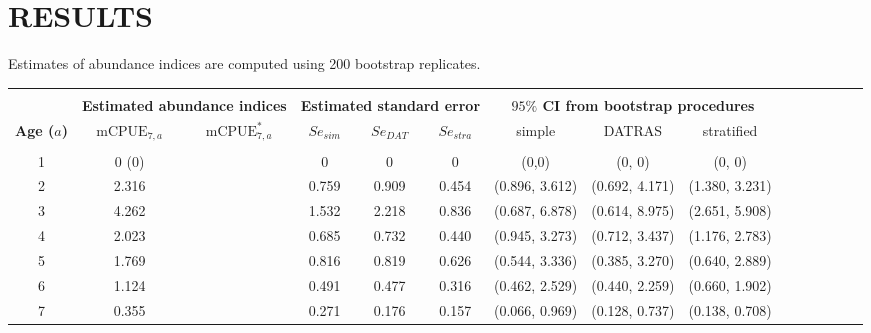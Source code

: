 \documentclass[a4paper 12pt]{article}
\numberwithin{equation}{section}
\begin{document}
\clearpage
\section{RESULTS}
Estimates of abundance indices are computed using 200 bootstrap replicates.

\begin{table}
\centering
{}
\begin{tabular}{ccccccccccccccc}
\hline \\[0.1ex]
  & \multicolumn{2}{c}{\bf Estimated abundance indices} & \multicolumn{3}{c}{\bf Estimated standard error} & \multicolumn{3}{c}{\bf $95 \%$ CI from bootstrap procedures }\\[1.5ex]
{\bf Age ($a$) }  & $\mathrm{mCPUE}_{7,a}$  & $\mathrm{mCPUE}^*_{7,a}$ & $Se_{sim}$ & $Se_{DAT}$  & $Se_{stra}$& simple & DATRAS & stratified \\[0.5ex]
\cmidrule(lr{0.5em}){1-1}  \cmidrule(lr{0.5em}){2-3}  \cmidrule(lr{0.5em}){4-6}  \cmidrule(lr{0.5em}){7-9}\\ [0.1ex]
1  & 0 (0) & &   0     & 0     & 0     & (0,0)          &(0, 0)         & (0, 0)    \\[1ex]
2  & 2.316 & &   0.759 & 0.909 & 0.454 & (0.896, 3.612) &(0.692, 4.171) &(1.380, 3.231)  \\[1ex]
3  & 4.262 & &   1.532 & 2.218 & 0.836 & (0.687, 6.878) &(0.614, 8.975) &(2.651, 5.908)  \\[1ex]
4  & 2.023 & &   0.685 & 0.732 & 0.440 & (0.945, 3.273) &(0.712, 3.437) &(1.176, 2.783)  \\[1ex]
5  & 1.769 & &   0.816 & 0.819 & 0.626 & (0.544, 3.336) &(0.385, 3.270) &(0.640, 2.889) \\[1ex]
6  & 1.124 & &   0.491 & 0.477 & 0.316 & (0.462, 2.529) &(0.440, 2.259) &(0.660, 1.902) \\[1ex]
7  & 0.355 & &   0.271 & 0.176 & 0.157 & (0.066, 0.969) &(0.128, 0.737) &(0.138, 0.708) \\[1ex]
\hline
\end{tabular}
\end{table}
\end{document}
